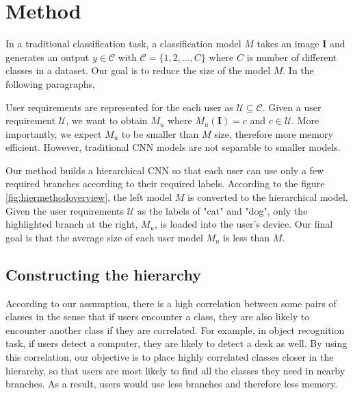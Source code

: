\section{Method}

In a traditional classification task, a classification model $M$ takes an image $\mathbf{I}$ and generates an output $y\in\mathcal{C}$ with $\mathcal{C} = \{1,2,\dots,C\}$ where $C$ is number of different classes in a dataset. Our goal is to reduce the size of the model $M$. In the following paragraphs, 

User requirements are represented for the each user as $\mathcal{U} \subseteq \mathcal{C}$. 
Given a user requirement $\mathcal{U}$, we want to obtain $M_u$ where $M_u(\mathbf{I}) = c$ and $c\in\mathcal{U}$. 
More importantly, we expect $M_u$ to be smaller than $M$ size, therefore more memory efficient. 
However, traditional CNN models are not separable to smaller models.

Our method builds a hierarchical CNN so that each user can use only a few required branches according to their required labels. 
According to the figure \ref{fig:hiermethodoverview}, the left model $M$ is converted to the hierarchical model. 
Given the user requirements $\mathcal{U}$ as the labels of "cat" and "dog", only the highlighted branch at the right, $M_u$, is loaded into the user's device. 
Our final goal is that the average size of each user model $M_u$ is less than $M$.


\subsection{Constructing the hierarchy}
\label{ssec:hierarchy}

According to our assumption, there is a high correlation between some pairs of classes in the sense that 
if users encounter a class, they are also likely to encounter another class if they are correlated. 
For example, in object recognition task, if users detect a computer, they are likely to detect a desk as well. 
By using this correlation, our objective is to place highly correlated classes closer in the hierarchy, 
so that users are most likely to find all the classes they need in nearby branches. 
As a result, users would use less branches and therefore less memory.

